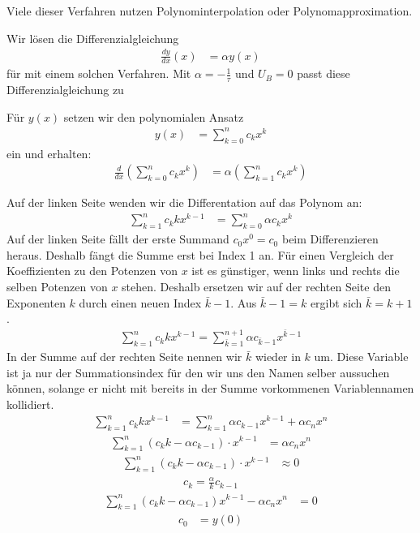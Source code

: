 \documentclass{article}
\let\l\left\let\r\right\let\cs\csname\let\ecs\endcsname\let\ea\expandafter
\def\ddx#1{\frac{d#1}{dx}}
\begin{document}
Viele dieser Verfahren nutzen Polynominterpolation oder
Polynomapproximation.

Wir lösen die Differenzialgleichung
\begin{align*}
  \ddx y(x) &= \alpha y(x)
\end{align*}
für mit einem solchen Verfahren.
Mit $\alpha=-\frac1{\tau}$ und $U_B=0$ passt diese Differenzialgleichung zu

Für $y(x)$ setzen wir den polynomialen Ansatz
\begin{align*}
  y(x) &= \sum_{k=0}^n c_k x^k
\end{align*}
ein und erhalten:
\begin{align*}
  \ddx{}\l(\sum_{k=0}^n c_k x^k\r) &=\alpha\l(\sum_{k=1}^n c_k x^k\r)
\end{align*}


Auf der linken Seite wenden wir die Differentation auf das Polynom an:
\begin{align*}
  \sum_{k=1}^n c_k k x^{k-1} &= \sum_{k=0}^n  \alpha c_k x^k
\end{align*}
Auf der linken Seite fällt der erste Summand $c_0x^0=c_0$ beim Differenzieren heraus. Deshalb fängt die Summe erst bei Index 1 an. Für einen Vergleich der Koeffizienten zu den Potenzen von $x$ ist es günstiger, wenn links und rechts die selben Potenzen von $x$ stehen. Deshalb ersetzen wir auf der rechten Seite den Exponenten $k$ durch einen neuen Index $\bar k-1$. Aus $\bar k-1 = k$ ergibt sich $\bar k=k+1$.
\begin{align*}
  \sum_{k = 1}^{n} c_k k x^{k-1} = \sum_{\bar k=1}^{n+1}  \alpha c_{\bar k-1} x^{\bar k-1}
\end{align*}
In der Summe auf der rechten Seite nennen wir $\bar k$ wieder in $k$ um. Diese Variable ist ja nur der Summationsindex für den wir uns den Namen selber aussuchen können, solange er nicht mit bereits in der Summe vorkommenen Variablennamen kollidiert.
\begin{align*}
  \sum_{k=1}^n c_k k x^{k-1} &= \sum_{k=1}^n \alpha c_{k-1} x^{k-1} + \alpha c_n x^n
\end{align*}
\begin{align*}
  \sum_{k=1}^n \l(c_kk - \alpha c_{k-1}\r)\cdot x^{k-1} &= \alpha c_n x^n
\end{align*}
\begin{align*}
  \sum_{k=1}^n \l(c_kk - \alpha c_{k-1}\r)\cdot x^{k-1} &\approx 0
\end{align*}
\begin{align*}
  c_{k} = \frac{\alpha}{k} c_{k-1}
\end{align*}
\begin{align*}
  \sum_{k=1}^{n} \l( c_{k} k- \alpha c_{k-1}\r) x^{k-1} - \alpha c_nx^n &= 0
\end{align*}
\begin{align*}
  c_0 &= y(0)
\end{align*}
\end{document}
